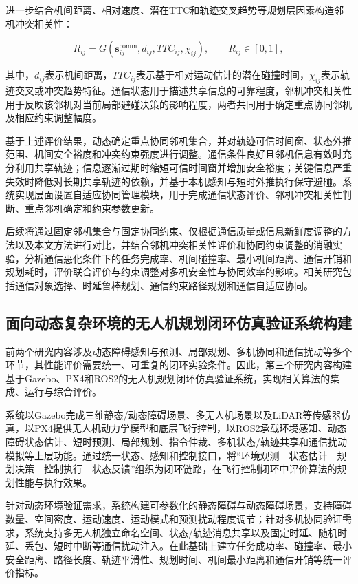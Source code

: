 进一步结合机间距离、相对速度、潜在TTC和轨迹交叉趋势等规划层因素构造邻机冲突相关性：

\begin{equation}
R_{ij}=G\left(\mathbf{s}^{\mathrm{comm}}_{ij},d_{ij},TTC_{ij},\chi_{ij}\right),\qquad R_{ij}\in[0,1],
\end{equation}

其中，$d_{ij}$表示机间距离，$TTC_{ij}$表示基于相对运动估计的潜在碰撞时间，$\chi_{ij}$表示轨迹交叉或冲突趋势特征。通信状态用于描述共享信息的可靠程度，邻机冲突相关性用于反映该邻机对当前局部避碰决策的影响程度，两者共同用于确定重点协同邻机及相应约束调整幅度。

基于上述评价结果，动态确定重点协同邻机集合，并对轨迹可信时间窗、状态外推范围、机间安全裕度和冲突约束强度进行调整。通信条件良好且邻机信息有效时充分利用共享轨迹；信息逐渐过期时缩短可信时间窗并增加安全裕度；关键信息严重失效时降低对长期共享轨迹的依赖，并基于本机感知与短时外推执行保守避碰。系统实现层面设置自适应协同管理模块，用于完成通信状态评价、邻机冲突相关性判断、重点邻机确定和约束参数更新。

后续将通过固定邻机集合与固定协同约束、仅根据通信质量或信息新鲜度调整的方法以及本文方法进行对比，并结合邻机冲突相关性评价和协同约束调整的消融实验，分析通信恶化条件下的任务完成率、机间碰撞率、最小机间距离、通信开销和规划耗时，评价联合评价与约束调整对多机安全性与协同效率的影响。相关研究包括通信对象选择、时延鲁棒规划、通信约束路径规划和通信自适应协同\cite{serragomez2020whom,robustMader,guo2024communication,liu2024power,xu2025search}。

\subsection{面向动态复杂环境的无人机规划闭环仿真验证系统构建}

前两个研究内容涉及动态障碍感知与预测、局部规划、多机协同和通信扰动等多个环节，其性能评价需要统一、可重复的闭环实验条件。因此，第三个研究内容构建基于Gazebo、PX4和ROS2的无人机规划闭环仿真验证系统，实现相关算法的集成、运行与综合评价。

系统以Gazebo完成三维静态/动态障碍场景、多无人机场景以及LiDAR等传感器仿真，以PX4提供无人机动力学模型和底层飞行控制，以ROS2承载环境感知、动态障碍状态估计、短时预测、局部规划、指令仲裁、多机状态/轨迹共享和通信扰动模拟等上层功能。通过统一状态、感知和控制接口，将“环境观测—状态估计—规划决策—控制执行—状态反馈”组织为闭环链路，在飞行控制闭环中评价算法的规划性能与执行效果。

针对动态环境验证需求，系统构建可参数化的静态障碍与动态障碍场景，支持障碍数量、空间密度、运动速度、运动模式和预测扰动程度调节；针对多机协同验证需求，系统支持多无人机独立命名空间、状态/轨迹消息共享以及固定时延、随机时延、丢包、短时中断等通信扰动注入。在此基础上建立任务成功率、碰撞率、最小安全距离、路径长度、轨迹平滑性、规划时间、机间最小距离和通信开销等统一评价指标。

